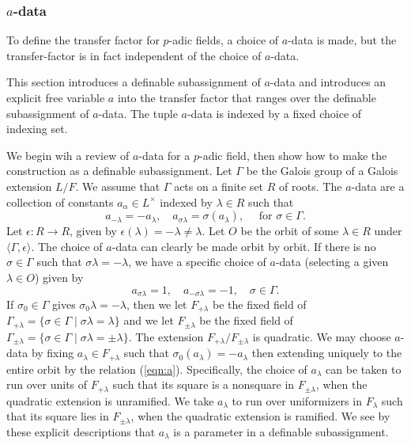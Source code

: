 \subsubsection{$a$-data}

To define the transfer factor for $p$-adic  fields, a choice of $a$-data is made, but the transfer-factor is in fact independent of the choice of $a$-data.

This section introduces a definable subassignment of $a$-data and introduces an explicit free variable $a$ into the transfer factor that ranges over
the definable subassignment of $a$-data.  The tuple $a$-data is indexed by a fixed choice of indexing set.  

We begin wih a review of $a$-data for a $p$-adic field, then show how to make the construction as a definable subassignment.
Let $\Gamma$ be the Galois group of a Galois extension $L/F$.  We assume that $\Gamma$ acts on a finite set $R$ of roots.
The $a$-data are a collection of constants $a_\alpha\in L^\times$ indexed by $\lambda\in R$ such that
\begin{equation}\label{eqn:a}
a_{-\lambda} = -a_\lambda,\quad a_{\sigma\lambda} = \sigma(a_\lambda),\quad \text{ for } \sigma\in \Gamma.
\end{equation}
Let $\epsilon:R\to R$, given by $\epsilon(\lambda)=-\lambda\ne\lambda$.  Let $O$ be the orbit of some $\lambda\in R$ under $\langle\Gamma,\epsilon\rangle$.
The choice of $a$-data can clearly be made orbit by orbit.
If there is no $\sigma\in \Gamma$ such that $\sigma\lambda=-\lambda$, we have a specific choice of $a$-data (selecting a given $\lambda\in O$) given by
\[
a_{\sigma\lambda}=1,\quad a_{-\sigma\lambda}=-1,\quad \sigma\in\Gamma.
\]
If $\sigma_0\in\Gamma$ gives $\sigma_0\lambda=-\lambda$,  then we let $F_{+\lambda}$ be the fixed field of $\Gamma_{+\lambda} = \{\sigma\in\Gamma\mid \sigma\lambda=\lambda\}$
and we let
$F_{\pm\lambda}$ be the fixed field of $\Gamma_{\pm\lambda} = \{\sigma\in\Gamma\mid \sigma\lambda=\pm\lambda\}$.
The extension $F_{+\lambda}/F_{\pm\lambda}$ is quadratic.
We may choose $a$-data by fixing $a_\lambda\in F_{+\lambda}$ such that $\sigma_0(a_\lambda) = -a_\lambda$ then extending uniquely to the entire orbit  by the relation (\ref{eqn:a}).
Specifically, the choice of $a_\lambda$ can be taken to run over units of $F_{+\lambda}$ such that its square is a nonsquare in $F_{\pm\lambda}$, when the quadratic extension is unramified.
We take $a_\lambda$ to run over uniformizers in $F_{\lambda}$ such that its square lies in $F_{\pm\lambda}$, when the quadratic extension is ramified.
We see by these explicit descriptions that $a_\lambda$ is a parameter in a definable subassignment.


